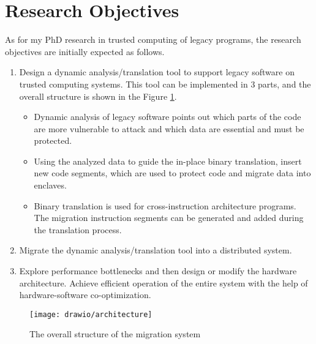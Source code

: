 \section{Research Objectives}
As for my PhD research in trusted computing of legacy programs, the research
objectives are initially expected as follows.
\begin{enumerate}[(1)]
    \item Design a dynamic analysis/translation tool to support legacy
    software on trusted computing systems. This tool can be implemented
    in 3 parts, and the overall structure is shown in the Figure \ref{fig:arch}.
    \begin{itemize}
        \item Dynamic analysis of legacy software points out which parts of the code are
        more vulnerable to attack and which data are essential and must be protected.
        \item Using the analyzed data to guide the in-place binary translation,
        insert new code segments, which are used to protect code and migrate data into enclaves.
        \item Binary translation is used for cross-instruction architecture programs. The migration
        instruction segments can be generated and added during the translation process.
    \end{itemize}
    \item Migrate the dynamic analysis/translation tool into a distributed system.
    \item Explore performance bottlenecks and then design or modify the hardware architecture.
    Achieve efficient operation of the entire system with the help of hardware-software
    co-optimization.
\end{enumerate}

\begin{figure}
    \centering
    \texttt{[image: drawio/architecture]}
    \caption{The overall structure of the migration system}
    \label{fig:arch}
\end{figure}